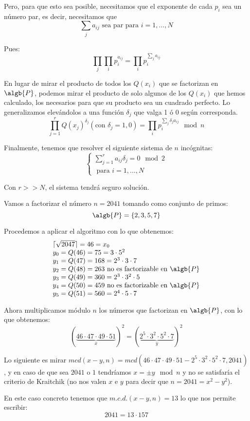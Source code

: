 \begin{mdframed}
Pero, para que esto sea posible, necesitamos que el exponente de cada $p_i$ sea un número par, es decir, necesitamos que
\[\sum_ja_{ij} \text{ sea par para } i={1,…,N}\]

Pues:
\[\prod_j\prod_ip_i^{a_{ij}} = \prod_i p_i^{\sum_ja_{ij}}\]

En lugar de mirar el producto de todos los $Q(x_i)$ que se factorizan en $\algb{P}$, podemos mirar el producto de solo algunos de los $Q(x_i)$ que hemos calculado, los necesarios para que su producto sea un cuadrado perfecto. Lo generalizamos elevándolos a una función $\delta_j$ que valga 1 ó 0 según corresponda.
\[\prod_{j=1}^r Q(x_j)^{δ_j} (\text{con } δ_j = 1,0)  = \prod_ip_i^{\sum_jδ_ja_{ij}} \mod n\]

Finalmente, tenemos que resolver el siguiente sistema de $n$ incógnitas:
\[\left\{ \begin{array}{l}
\sum\limits_{j=1}^{r}a_{ij}δ_j = 0 \mod 2 \\
\text{ para } i=1,...,N
\end{array}\right.\]

\obs Con $r >> N$, el sistema tendrá seguro solución.
\end{mdframed}

\begin{example}
Vamos a factorizar el número $n=2041$ tomando como conjunto de primos:
\[\algb{P} = \{ 2,3,5,7\}\]

Procedemos a aplicar el algoritmo con lo que obtenemos:
\[\begin{array}{l}
\lceil\sqrt{2047}\rceil = 46 = x_0 \\
y_0 = Q(46) = 75 = 3 \cdot 5^2\\
y_1 = Q(47) = 168 = 2^3 \cdot 3 \cdot 7\\
y_2 = Q(48) = 263 \text{ no es factorizable en }\algb{P} \\
y_3 = Q(49) = 360 = 2^3 \cdot 3^2 \cdot 5\\
y_4 = Q(50) = 459 \text{ no es factorizable en }\algb{P} \\
y_5 = Q(51) = 560 = 2^4 \cdot 5 \cdot 7
\end{array}\]

Ahora multiplicamos módulo $n$ los números que factorizan en $\algb{P}$, con lo que obtenemos:
\[(\underbrace{46\cdot 47 \cdot 49 \cdot 51}_{x})^2 = (\underbrace{2^5\cdot 3^2 \cdot 5^2 \cdot 7}_y)^2\]

Lo siguiente es mirar $mcd(x-y, n)=mcd(46\cdot 47 \cdot 49 \cdot 51 - 2^5\cdot 3^2 \cdot 5^2 \cdot 7, 2041)$, y en caso de que sea $2041$ o $1$ tendríamos $x=\pm y \mod n$ y no se satisfaría el criterio de Kraitchik (no nos valen $x$ e $y$ para decir que $n=2041=x^2-y^2$).

En este caso concreto tenemos que $m.c.d.(x-y,n)=13$ lo que nos permite escribir:
\[2041 = 13 \cdot 157\]
\end{example}


